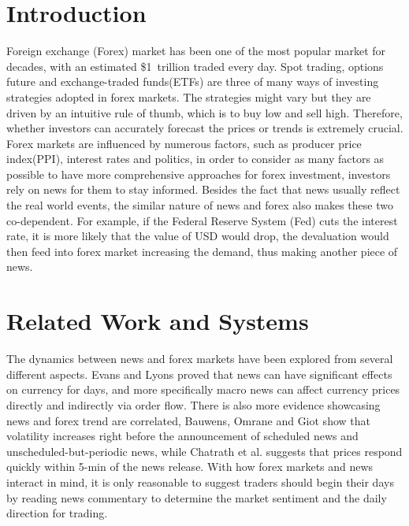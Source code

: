\documentclass[sigconf]{acmart}
\begin{document}
\section{Introduction}
Foreign exchange (Forex) market has been one of the most popular market for decades, with an estimated \$1\  trillion traded every day\cite{YAO200079}. Spot trading, options future and exchange-traded funds(ETFs) are three of many ways of investing strategies adopted in forex markets\cite{TradeForex}. The strategies might vary but they are driven by an intuitive rule of thumb, which is to buy low and sell high\cite{KOOLEN2014144}\cite{Zervos11}. Therefore, whether investors can accurately forecast the prices or trends is extremely crucial. Forex markets are influenced by numerous factors, such as producer price index(PPI), interest rates and politics, in order to consider as many factors as possible to have more comprehensive approaches for forex investment, investors rely on news for them to stay informed. Besides the fact that news usually reflect the real world events, the similar nature of news and forex also makes these two co-dependent. For example, if the Federal Reserve System (Fed) cuts the interest rate, it is more likely that the value of USD would drop, the devaluation would then feed into forex market increasing the demand, thus making another piece of news. 

\section{Related Work and Systems}
The dynamics between news and forex markets have been explored from several different aspects. Evans and Lyons proved that news can have significant effects on currency for days\cite{EVANS2005197}, and more specifically macro news can affect currency prices directly and indirectly via order flow\cite{EVANS200826}. There is also more evidence showcasing news and forex trend are correlated, Bauwens, Omrane and Giot show that volatility increases right before the announcement of scheduled news and unscheduled-but-periodic news\cite{BAUWENS20051108}, while Chatrath et al. suggests that prices respond quickly within 5-min of the news release\cite{CHATRATH201442}. With how forex markets and news interact in mind, it is only reasonable to suggest traders should begin their days by reading news commentary to determine the market sentiment and the daily direction for trading\cite{samuels2015trader}.
\end{document}
